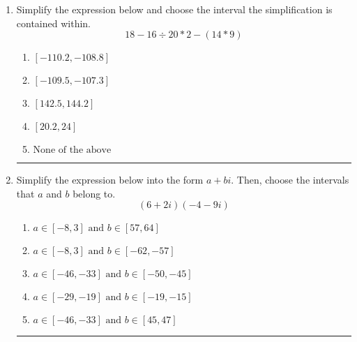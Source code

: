 \documentclass[14pt]{extbook}
\newcommand{\litem}[1]{\item#1\hspace*{-1cm}\rule{\textwidth}{0.4pt}}
\begin{document}
\begin{enumerate}
{\begin{enumerate}[label=\Alph*.]
\end{enumerate} }
\litem{
Simplify the expression below and choose the interval the simplification is contained within.\[ 18 - 16 \div 20 * 2 - (14 * 9) \]\begin{enumerate}[label=\Alph*.]
\item \( [-110.2, -108.8] \)
\item \( [-109.5, -107.3] \)
\item \( [142.5, 144.2] \)
\item \( [20.2, 24] \)
\item \( \text{None of the above} \)

\end{enumerate} }
\litem{
Simplify the expression below into the form $a+bi$. Then, choose the intervals that $a$ and $b$ belong to.\[ (6 + 2 i)(-4 - 9 i) \]\begin{enumerate}[label=\Alph*.]
\item \( a \in [-8, 3] \text{ and } b \in [57, 64] \)
\item \( a \in [-8, 3] \text{ and } b \in [-62, -57] \)
\item \( a \in [-46, -33] \text{ and } b \in [-50, -45] \)
\item \( a \in [-29, -19] \text{ and } b \in [-19, -15] \)
\item \( a \in [-46, -33] \text{ and } b \in [45, 47] \)

\end{enumerate} }
\end{enumerate}
\end{document}
